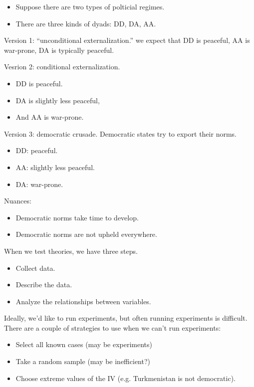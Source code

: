 \documentclass{article}
\begin{document}
\begin{itemize}
  \item Suppose there are two types of polticial regimes.
  \item There are three kinds of dyads: DD, DA, AA.
\end{itemize}

Version 1: ``unconditional externalization.'' we expect that DD is peaceful, AA is war-prone, DA is typically peaceful.

Vesrion 2: conditional externalization.

\begin{itemize}
  \item DD is peaceful.
  \item DA is slightly less peaceful,
  \item And AA is war-prone.
\end{itemize}

Version 3: democratic crusade. Democratic states try to export their norms.
\begin{itemize}
  \item DD: peaceful.
  \item AA: slightly less peaceful.
  \item DA: war-prone.
\end{itemize}

Nuances:

\begin{itemize}
  \item Democratic norms take time to develop.
  \item Democratic norms are not upheld everywhere.
\end{itemize}

When we test theories, we have three steps.

\begin{itemize}
  \item Collect data.
  \item Describe the data.
  \item Analyze the relationships between variables.
\end{itemize}

Ideally, we'd like to run experiments, but often running experiments is difficult.  There are a couple of strategies to use when we can't run experiments:

\begin{itemize}
  \item Select all known cases (may be experiments)
  \item Take a random sample (may be inefficient?)
  \item Choose extreme values of the IV (e.g. Turkmenistan is not democratic).
\end{itemize}
\end{document}
